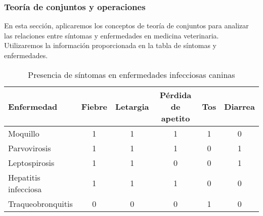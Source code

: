 \documentclass[a4,11pt]{aleph-notas}
\begin{document}
\subsubsection{Teoría de conjuntos y operaciones}

En esta sección, aplicaremos los conceptos de teoría de conjuntos para analizar las relaciones entre síntomas y enfermedades en medicina veterinaria. Utilizaremos la información proporcionada en la tabla de síntomas y enfermedades.

\begin{table}[H]
\centering\small
\begin{tabular}{lccccc}
\toprule
\textbf{Enfermedad} & \textbf{Fiebre} & \textbf{Letargia} & \textbf{Pérdida de apetito} & \textbf{Tos} & \textbf{Diarrea} \\
\midrule
Moquillo & 1 & 1 & 1 & 1 & 0 \\
Parvovirosis & 1 & 1 & 1 & 0 & 1 \\
Leptospirosis & 1 & 1 & 0 & 0 & 1 \\
Hepatitis infecciosa & 1 & 1 & 1 & 0 & 0 \\
Traqueobronquitis & 0 & 0 & 0 & 1 & 0 \\
\bottomrule
\end{tabular}
\caption{Presencia de síntomas en enfermedades infecciosas caninas}
\label{tabla:sintomas_enfermedades}
\end{table}
\end{document}
